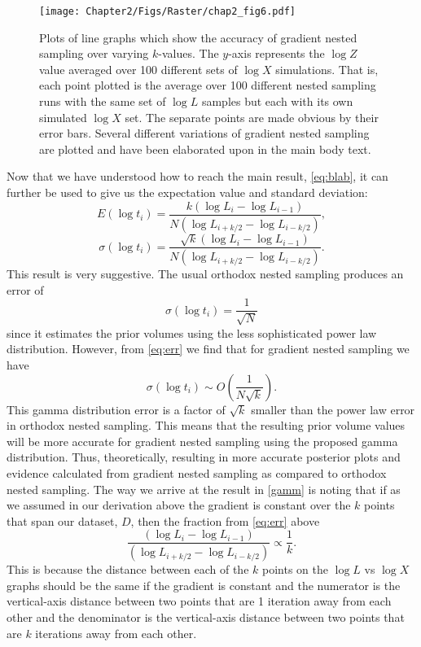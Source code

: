 \begin{figure} 
\centering    
\texttt{[image: Chapter2/Figs/Raster/chap2\_fig6.pdf]}
\caption{ Plots of line graphs which show the accuracy of gradient nested sampling over varying $k$-values. The $y$-axis represents the $\log Z$ value averaged over 100 different sets of $\log X$ simulations. That is, each point plotted is the average over 100 different nested sampling runs with the same set of $\log L$ samples but each with its own simulated $\log X$ set. The separate points are made obvious by their error bars. Several different variations of gradient nested sampling are plotted and have been elaborated upon in the main body text.}
\label{fig:loglolol}
\end{figure}

Now that we have understood how to reach the main result, \cref{eq:blab}, it can further be used to give us the expectation value and standard deviation:
%
\begin{equation}
  E(\log t_i)=  \frac{k(\log L_i-\log L_{i-1})}{N(\log L_{i+k/2}-\log L_{i-k/2})}, 
\label{eq:mean}
\end{equation}
%
\begin{equation}
  \sigma(\log t_i)=  \frac{\sqrt{k}(\log L_i-\log L_{i-1})}{N(\log L_{i+k/2}-\log L_{i-k/2})}.  
\label{eq:err}
\end{equation}
%
This result is very suggestive. The usual orthodox nested sampling produces an error of 
%
\begin{equation}
    \sigma(\log t_i)= \frac{1}{\sqrt{N}}
\end{equation}
%
since it estimates the prior volumes using the less sophisticated power law distribution. However, from \cref{eq:err} we find that for gradient nested sampling we have
%
\begin{equation}
  \sigma(\log t_i) \sim O(\frac{1}{N \sqrt{k}}). 
\label{eq:gamm}
\end{equation}
%
This gamma distribution error is a factor of $\sqrt{k}$ smaller than the power law error in orthodox nested sampling. This means that the resulting prior volume values will be more accurate for gradient nested sampling using the proposed gamma distribution. Thus, theoretically, resulting in more accurate posterior plots and evidence calculated from gradient nested sampling as compared to orthodox nested sampling. 
The way we arrive at the result in \cref{gamm} is noting that if as we assumed in our derivation above the gradient is constant over the $k$ points that span our dataset, $D$, then the fraction from \cref{eq:err} above
%
\begin{equation}
\frac{(\log L_i-\log L_{i-1})}{(\log L_{i+k/2}-\log L_{i-k/2})}   \propto \frac{1}{k}. 
\end{equation}
%
This is because the distance between each of the $k$ points on the $\log L$ vs $\log X$ graphs should be the same if the gradient is constant and the numerator is the vertical-axis distance between two points that are 1 iteration away from each other and the denominator is the vertical-axis distance between two points that are $k$ iterations away from each other.




